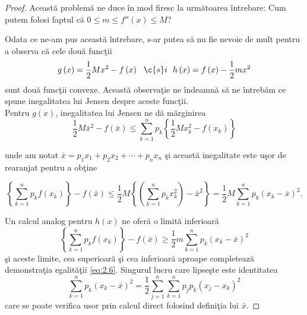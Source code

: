 \documentclass[a4paper,12pt,oneside]{report}
\begin{document}
\begin{proof}
Aceast\u{a} problem\u{a} ne duce \^{i}n mod firesc la urm\u{a}toarea \^{i}ntrebare: Cum putem folosi faptul c\u{a} \(0\leq m\leq {f}''\left ( x \right )\leq M \)?

Odata ce ne-am pus aceast\u{a} \^{i}ntrebare, s-ar putea s\u{a} nu fie nevoie de mult pentru a observa c\u{a} cele dou\u{a} func\c{t}ii
\begin{displaymath}
  g\left ( x \right ) = \frac{1}{2}Mx^{2} - f\left ( x \right )~~ \c{s}i~~
h\left ( x \right ) = f\left ( x \right ) - \frac{1}{2}mx^{2}
\end{displaymath}
sunt dou\u{a} func\c{t}ii convexe.
Aceast\u{a} observa\c{t}ie ne \^{i}ndeamn\u{a} s\u{a} ne \^{i}ntreb\u{a}m ce spune inegalitatea lui Jensen despre aceste func\c{t}ii.\\

Pentru \(g\left ( x \right )\), inegalitatea lui Jensen ne d\u{a} m\u{a}rginirea
\begin{displaymath}
  \frac{1}{2}M\bar{x}^{2} - f\left ( \bar{x} \right )\leq \sum_{k = 1}^{n}p_{k}\left \{ \frac{1}{2}Mx_{k}^{2} - f\left ( x_{k} \right )\right \}
\end{displaymath}

unde am notat \(\bar{x} = p_{1}x_{1}+ p_{2}x_{2}+ \cdots + p_{n}x_{n}\) \c{s}i aceast\u{a} inegalitate este u\c{s}or de rearanjat  pentru a ob\c{t}ine

\begin{displaymath}
  \left \{ \sum_{k = 1}^{n} p_{k}f\left ( x_{k} \right )\right \} - f\left (\bar{x}  \right )\leq \frac{1}{2}M\left \{ \left ( \sum_{k=1}^{n} p_{k}x_{k}^{2}\right ) - \bar{x}^{2} \right \} = \frac{1}{2}M\sum_{k = 1}^{n}p_{k}\left ( x_{k} - \bar{x} \right )^{2}.
\end{displaymath}

Un calcul analog pentru  \(h\left ( x \right )\) ne ofer\u{a} o limit\u{a} inferioar\u{a}
\begin{displaymath}
  \left \{ \sum_{k = 1}^{n} p_{k}f\left ( x_{k} \right )\right \} - f\left (\bar{x}  \right )\geq \frac{1}{2}m\sum_{k = 1}^{n}p_{k}\left ( x_{k} - \bar{x} \right )^{2}
\end{displaymath}
\c{s}i aceste limite, cea superioar\u{a} \c{s}i cea inferioar\u{a} aproape completeaz\u{a} demonstra\c{t}ia egalit\u{a}\c{t}ii  \ref{eq:2.6}. Singurul lucru care lipse\c{s}te este identitatea
\begin{displaymath}
  \sum_{k = 1}^{n}p_{k}\left ( x_{k} - \bar{x} \right )^{2} = \frac{1}{2}\sum_{j = 1}^{n}\sum_{k = 1}^{n} p _{j}p_{k}\left ( x_{j} - x_{k} \right )^{2}
\end{displaymath}
care se poate verifica usor prin calcul direct folosind defini\c{t}ia lui \(\bar{x}\).
\end{proof}
\end{document}
